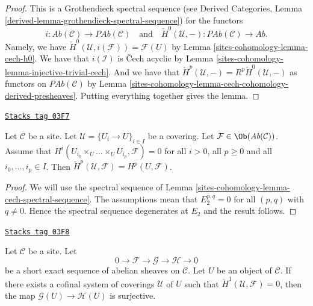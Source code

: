 \begin{proof}
This is a Grothendieck spectral sequence (see
Derived Categories, Lemma \ref{derived-lemma-grothendieck-spectral-sequence})
for the functors
$$
i :  \textit{Ab}(\mathcal{C}) \to \textit{PAb}(\mathcal{C})
\quad\text{and}\quad
\check{H}^0(\mathcal{U}, - ) : \textit{PAb}(\mathcal{C})
\to \textit{Ab}.
$$
Namely, we have $\check{H}^0(\mathcal{U}, i(\mathcal{F})) = \mathcal{F}(U)$
by Lemma \ref{sites-cohomology-lemma-cech-h0}. We have that $i(\mathcal{I})$ is
{\v C}ech acyclic by Lemma \ref{sites-cohomology-lemma-injective-trivial-cech}. And we
have that $\check{H}^p(\mathcal{U}, -) = R^p\check{H}^0(\mathcal{U}, -)$
as functors on $\textit{PAb}(\mathcal{C})$
by Lemma \ref{sites-cohomology-lemma-cech-cohomology-derived-presheaves}.
Putting everything together gives the lemma.
\end{proof}

\begin{lemma}
\label{sites-cohomology-lemma-cech-spectral-sequence-application}
\href{https://stacks.math.columbia.edu/tag/03F7}{\texttt{Stacks tag 03F7}}

Let $\mathcal{C}$ be a site.
Let $\mathcal{U} = \{U_i \to U\}_{i \in I}$ be a covering.
Let $\mathcal{F} \in \Ob(\textit{Ab}(\mathcal{C}))$.
Assume that $H^i(U_{i_0} \times_U \ldots \times_U U_{i_p}, \mathcal{F}) = 0$
for all $i > 0$, all $p \geq 0$ and all $i_0, \ldots, i_p \in I$.
Then $\check{H}^p(\mathcal{U}, \mathcal{F}) = H^p(U, \mathcal{F})$.
\end{lemma}

\begin{proof}
We will use the spectral sequence of
Lemma \ref{sites-cohomology-lemma-cech-spectral-sequence}.
The assumptions mean that $E_2^{p, q} = 0$ for all $(p, q)$ with
$q \not = 0$. Hence the spectral sequence degenerates at $E_2$
and the result follows.
\end{proof}

\begin{lemma}
\label{sites-cohomology-lemma-ses-cech-h1}
\href{https://stacks.math.columbia.edu/tag/03F8}{\texttt{Stacks tag 03F8}}

Let $\mathcal{C}$ be a site.
Let
$$
0 \to \mathcal{F} \to \mathcal{G} \to \mathcal{H} \to 0
$$
be a short exact sequence of abelian sheaves on $\mathcal{C}$.
Let $U$ be an object of $\mathcal{C}$. If there exists a cofinal system
of coverings $\mathcal{U}$ of $U$ such that
$\check{H}^1(\mathcal{U}, \mathcal{F}) = 0$,
then the map $\mathcal{G}(U) \to \mathcal{H}(U)$ is
surjective.
\end{lemma}

